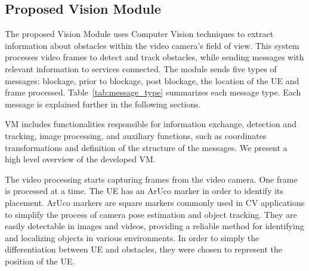 \subsection{Proposed Vision Module}\label{subsec:prop_vision}
The proposed Vision Module uses Computer Vision techniques to extract information about obstacles within the video camera's field of view.
This system processes video frames to detect and track obstacles, while sending messages with relevant information to services connected.
The module sends five types of messages: blockage, prior to blockage, post blockage, the location of the UE and frame processed.
Table~\ref{tab:message_type} summarizes each message type.
Each message is explained further in the following sections.

\begin{table}[H]
    \caption{Summary of each message type.}
    \label{tab:message_type}
    \centering
\end{table}

VM includes functionalities responsible for information exchange, detection and tracking, image processing, and auxiliary functions, such as coordinates transformations and definition of the structure of the messages.
We present a high level overview of the developed VM\@.

The video processing starts capturing frames from the video camera.
One frame is processed at a time.
The UE has an ArUco marker in order to identify its placement.
ArUco markers are square markers commonly used in CV applications to simplify the process of camera pose estimation and object tracking.
They are easily detectable in images and videos, providing a reliable method for identifying and localizing objects in various environments.
In order to simply the differentiation between UE and obstacles, they were chosen to represent the position of the UE\@.

